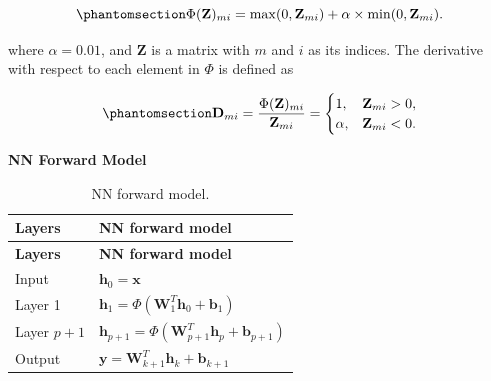 \documentclass[
  letterpaper,
  open=any]{scrbook}
\begin{document}
\begin{equation}\phantomsection\label{eq-leakyrelu}{
\Phi(\mathbf{Z})_{mi}
=
\max(0,\mathbf{Z}_{mi})
+
\alpha \times \min(0,\mathbf{Z}_{mi}).
}\end{equation}

where \(\alpha=0.01\), and \(\mathbf{Z}\) is a matrix with \(m\) and
\(i\) as its indices. The derivative with respect to each element in
\(\Phi\) is defined as

\begin{equation}\phantomsection\label{eq-D}{
\mathbf{D}_{mi}
=
\frac{\Phi(\mathbf{Z})_{mi}}
{\mathbf{Z}_{mi}}
=
\begin{cases}
1, & \mathbf{Z}_{mi}>0, \\
\alpha, & \mathbf{Z}_{mi}<0.
\end{cases}
}\end{equation}

\textbf{NN Forward Model}

\begin{longtable}[]{@{}
  >{\raggedright\arraybackslash}p{}
  >{\raggedright\arraybackslash}p{}@{}}
\caption{NN forward model.}\label{tbl-nn-forward}\tabularnewline
\toprule\noalign{}
\begin{minipage}[b]{\linewidth}\raggedright
\textbf{Layers}
\end{minipage} & \begin{minipage}[b]{\linewidth}\raggedright
\textbf{NN forward model}
\end{minipage} \\
\midrule\noalign{}
\endfirsthead
\toprule\noalign{}
\begin{minipage}[b]{\linewidth}\raggedright
\textbf{Layers}
\end{minipage} & \begin{minipage}[b]{\linewidth}\raggedright
\textbf{NN forward model}
\end{minipage} \\
\midrule\noalign{}
\endhead
\bottomrule\noalign{}
\endlastfoot
Input & \(\mathbf{h}_0=\mathbf{x}\) \\
Layer 1 &
\(\mathbf{h}_1=\Phi(\mathbf{W}_1^T\mathbf{h}_0+\mathbf{b}_1)\) \\
Layer \(p+1\) &
\(\mathbf{h}_{p+1}=\Phi(\mathbf{W}_{p+1}^T\mathbf{h}_p+\mathbf{b}_{p+1})\) \\
Output &
\(\mathbf{y}=\mathbf{W}_{k+1}^T\mathbf{h}_k+\mathbf{b}_{k+1}\) \\
\end{longtable}
\end{document}

